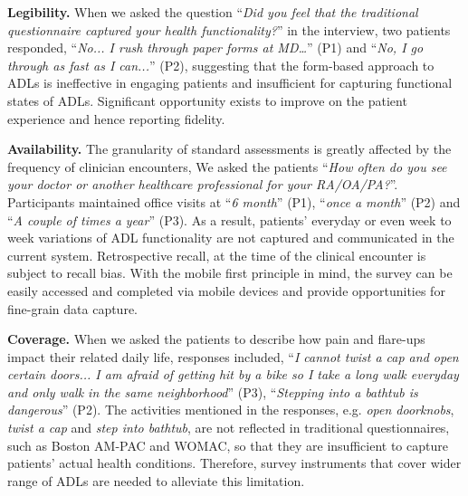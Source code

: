 \documentclass{sig-alternate-05-2015}
\begin{document}
\textbf{Legibility.} When we asked the question ``\textit{Did you feel that the traditional questionnaire captured your health functionality?}'' in the interview, two patients responded, ``\textit{No... I rush through paper forms at MD…}'' (P1) and ``\textit{No, I go through as fast as I can...}'' (P2), suggesting that the form-based approach to ADLs is ineffective in engaging patients and insufficient for capturing functional states of ADLs. Significant opportunity exists to improve on the patient experience and hence reporting fidelity.

\textbf{Availability.} The granularity of standard assessments is greatly affected by the frequency of clinician encounters, We asked the patients ``\textit{How often do you see your doctor or another healthcare professional for your RA/OA/PA?}''. Participants maintained office visits at  ``\textit{6 month}'' (P1), ``\textit{once a month}'' (P2) and ``\textit{A couple of times a year}'' (P3). As a result, patients' everyday or even week to week variations of ADL functionality are not captured and communicated in the current system. Retrospective recall, at the time of the clinical encounter is subject to recall bias. With the mobile first principle in mind, the survey can be easily accessed and completed via mobile devices and provide opportunities for fine-grain data capture.

\textbf{Coverage.} When we asked the patients to describe how pain and flare-ups impact their related daily life, responses included, ``\textit{I cannot twist a cap and open certain doors... I am afraid of getting hit by a bike so I take a long walk everyday and only walk in the same neighborhood}'' (P3), ``\textit{Stepping into a bathtub is dangerous}'' (P2). The activities mentioned in the responses, e.g. \textit{open doorknobs}, \textit{twist a cap} and \textit{step into bathtub}, are not reflected in traditional questionnaires, such as Boston AM-PAC and WOMAC, so that they are insufficient to capture patients' actual health conditions. Therefore, survey instruments that cover wider range of ADLs are needed to alleviate this limitation.
\end{document}
